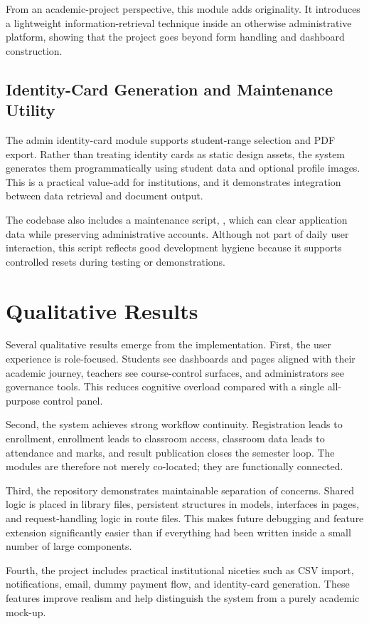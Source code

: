 \documentclass[12pt,a4paper]{report}
\newcommand{\filepath}[1]{\texttt{\detokenize{#1}}}
\begin{document}
From an academic-project perspective, this module adds originality. It introduces a lightweight information-retrieval technique inside an otherwise administrative platform, showing that the project goes beyond form handling and dashboard construction.

\subsection{Identity-Card Generation and Maintenance Utility}
The admin identity-card module supports student-range selection and PDF export. Rather than treating identity cards as static design assets, the system generates them programmatically using student data and optional profile images. This is a practical value-add for institutions, and it demonstrates integration between data retrieval and document output.

The codebase also includes a maintenance script, \filepath{src/scripts/reset-keep-admin.ts}, which can clear application data while preserving administrative accounts. Although not part of daily user interaction, this script reflects good development hygiene because it supports controlled resets during testing or demonstrations.

\section{Qualitative Results}
Several qualitative results emerge from the implementation. First, the user experience is role-focused. Students see dashboards and pages aligned with their academic journey, teachers see course-control surfaces, and administrators see governance tools. This reduces cognitive overload compared with a single all-purpose control panel.

Second, the system achieves strong workflow continuity. Registration leads to enrollment, enrollment leads to classroom access, classroom data leads to attendance and marks, and result publication closes the semester loop. The modules are therefore not merely co-located; they are functionally connected.

Third, the repository demonstrates maintainable separation of concerns. Shared logic is placed in library files, persistent structures in models, interfaces in pages, and request-handling logic in route files. This makes future debugging and feature extension significantly easier than if everything had been written inside a small number of large components.

Fourth, the project includes practical institutional niceties such as CSV import, notifications, email, dummy payment flow, and identity-card generation. These features improve realism and help distinguish the system from a purely academic mock-up.
\end{document}
